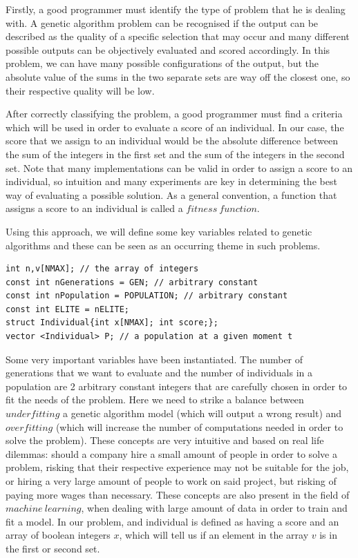\documentclass[letterpaper]{article}
\begin{document}
Firstly, a good programmer must identify the type of problem that he is dealing with. A genetic algorithm problem can be recognised if the output can be described as the quality of a specific selection that may occur and many different possible outputs can be objectively evaluated and scored accordingly. In this problem, we can have many possible configurations of the output, but the absolute value of the sums in the two separate sets are way off the closest one, so their respective quality will be low.

After correctly classifying the problem, a good programmer must find a criteria which will be used in order to evaluate a score of an individual. In our case, the score that we assign to an individual would be the absolute difference between the sum of the integers in the first set and the sum of the integers in the second set. Note that many implementations can be valid in order to assign a score to an individual, so intuition and many experiments are key in determining the best way of evaluating a possible solution. As a general convention, a function that assigns a score to an individual is called a $fitness \ function$.

Using this approach, we will define some key variables related to genetic algorithms and these can be seen as an occurring theme in such problems.

\begin{lstlisting}
int n,v[NMAX]; // the array of integers
const int nGenerations = GEN; // arbitrary constant
const int nPopulation = POPULATION; // arbitrary constant
const int ELITE = nELITE;
struct Individual{int x[NMAX]; int score;};
vector <Individual> P; // a population at a given moment t
\end{lstlisting}

Some very important variables have been instantiated. The number of generations that we want to evaluate and the number of individuals in a population are 2 arbitrary constant integers that are carefully chosen in order to fit the needs of the problem. Here we need to strike a balance between $underfitting$ a genetic algorithm model (which will output a wrong result) and $overfitting$ (which will increase the number of computations needed in order to solve the problem). These concepts are very intuitive and based on real life dilemmas: should a company hire a small amount of people in order to solve a problem, risking that their respective experience may not be suitable for the job, or hiring a very large amount of people to work on said project, but risking of paying more wages than necessary. These concepts are also present in the field of $machine \ learning$, when dealing with large amount of data in order to train and fit a model. In our problem, and individual is defined as having a score and an array of boolean integers $x$, which will tell us if an element in the array $v$ is in the first or second set.
\end{document}

